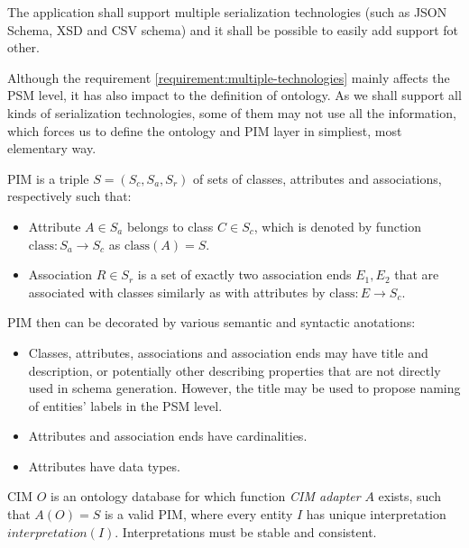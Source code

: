 \begin{requirement}
    \label{requirement:multiple-technologies}
    The application shall support multiple serialization technologies (such as JSON Schema, XSD and CSV schema) and it shall be possible to easily add support fot other.
\end{requirement}

Although the requirement \ref{requirement:multiple-technologies} mainly affects the PSM level, it has also impact to the definition of ontology. As we shall support all kinds of serialization technologies, some of them may not use all the information, which forces us to define the ontology and PIM layer in simpliest, most elementary way.

\begin{definition}[PIM] PIM is a triple $S=(S_c, S_a, S_r)$ of sets of classes, attributes and associations, respectively such that:
\begin{itemize}
    \item Attribute $A \in S_a$ belongs to class $C \in S_c$, which is denoted by function $\textrm{class}: S_a \rightarrow S_c$ as $\textrm{class}(A)=S$.
    \item Association $R \in S_r$ is a set of exactly two association ends ${E_1, E_2}$ that are associated with classes similarly as with attributes by $\textrm{class}: E \rightarrow S_c$.
\end{itemize}
\end{definition}

PIM then can be decorated by various semantic and syntactic anotations:

\begin{itemize}
    \item Classes, attributes, associations and association ends may have title and description, or potentially other describing properties that are not directly used in schema generation. However, the title may be used to propose naming of entities' labels in the PSM level.
    \item Attributes and association ends have cardinalities.
    \item Attributes have data types.
\end{itemize}

\begin{definition}[CIM]
CIM $O$ is an ontology database for which function \textit{CIM adapter} $A$ exists, such that $A(O) = S$ is a valid PIM, where every entity $I$ has unique interpretation $interpretation(I)$. Interpretations must be stable and consistent.
\end{definition}

